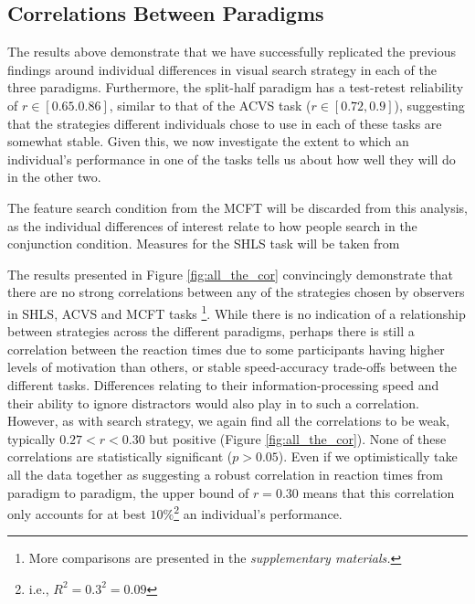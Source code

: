 \documentclass[]{rsos}%
\begin{document}
\subsection{Correlations Between Paradigms}

The results above demonstrate that we have successfully replicated the previous findings around individual differences in visual search strategy in each of the three paradigms. Furthermore, the split-half paradigm has a test-retest reliability of $r \in [0.65. 0.86]$, similar to that of the ACVS task ($r \in [0.72, 0.9]$), suggesting that the strategies different individuals chose to use in each of these tasks are somewhat stable. Given this, we now investigate the extent to which an individual's performance in one of the tasks tells us about how well they will do in the other two. 

The feature search condition from the MCFT will be discarded from this analysis, as the individual differences of interest relate to how people search in the conjunction condition. Measures for the SHLS task will be taken from 


The results presented in Figure \ref{fig:all_the_cor} convincingly demonstrate that there are no strong correlations between any of the strategies chosen by observers in SHLS, ACVS and MCFT tasks \footnote{More comparisons are presented in the \textit{supplementary materials.}}. 
While there is no indication of a relationship between strategies across the different paradigms, perhaps there is still a correlation between the reaction times due to some participants having higher levels of motivation than others, or stable speed-accuracy trade-offs between the different tasks. Differences relating to their information-processing speed and their ability to ignore distractors would also play in to such a correlation. However, as with search strategy, we again find all the correlations to be weak, typically $0.27 < r <0.30$ but positive (Figure \ref{fig:all_the_cor}). None of these correlations are statistically significant ($p>0.05$). Even if we optimistically take all the data together as suggesting a robust correlation in reaction times from paradigm to paradigm, the upper bound of $r=0.30$ means that this correlation only accounts for at best $10\%$\footnote{i.e., $R^2 = 0.3^2 = 0.09$} an individual's performance. 

\end{document}
